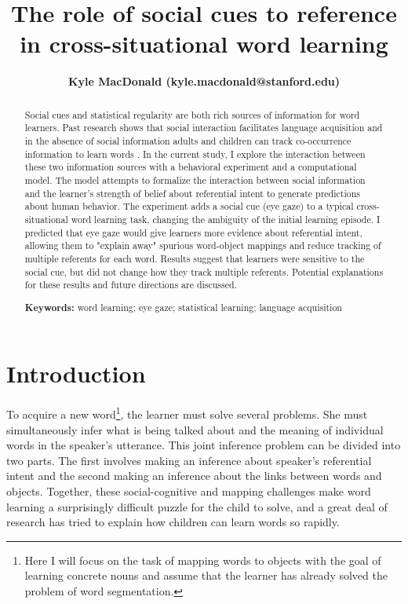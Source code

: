 \documentclass[10pt,letterpaper]{article}
\title{The role of social cues to reference in cross-situational word learning}
\author{{\large \bf Kyle MacDonald (kyle.macdonald@stanford.edu)}}
\begin{document}
\maketitle


\begin{abstract}
Social cues and statistical regularity are both rich sources of information for word learners. Past research shows that social interaction facilitates language acquisition \cite{baldwin1995understanding, brooks2008infant} and in the absence of social information adults and children can track co-occurrence information to learn words \cite{blythe2010learning,smith2008infants}.  In the current study, I explore the interaction between these two information sources with a behavioral experiment and a computational model. The model attempts to formalize the interaction between social information and the learner's strength of belief about referential intent to generate predictions about human behavior. The experiment adds a social cue (eye gaze) to a typical cross-situational word learning task, changing the ambiguity of the initial learning episode. I predicted that eye gaze would give learners more evidence about referential intent, allowing them to "explain away" spurious word-object mappings and reduce tracking of multiple referents for each word. Results suggest that learners were sensitive to the social cue, but did not change how they track multiple referents. Potential explanations for these results and future directions are discussed.  

\textbf{Keywords:} 
word learning; eye gaze; statistical learning; language acquisition
\end{abstract}


\section{Introduction}
To acquire a new word\footnote{Here I will focus on the task of mapping words to objects with the goal of learning concrete nouns and assume that the learner has already solved the problem of word segmentation.}, the learner must solve several problems. She must simultaneously infer what is being talked about and the meaning of individual words in the speaker's utterance. This joint inference problem can be divided into two parts. The first involves making an inference about speaker's referential intent and the second making an inference about the links between words and objects. Together, these social-cognitive and mapping challenges make word learning a surprisingly difficult puzzle for the child to solve, and a great deal of research has tried to explain how children can learn words so rapidly.
\end{document}
